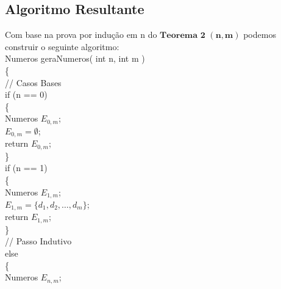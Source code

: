 \documentclass[twoside]{article}
\begin{document}
\begin{multicols}{2}
\subsection{ Algoritmo Resultante }
\indent 
Com base na prova por indução em n do $\mathbf{Teorema}$ $\mathbf{2}$ $\mathbf{(n,m)}$ podemos construir o seguinte algoritmo:\\
{\color[rgb]{0,0,1} Numeros} {\color[rgb]{0,0.5,0.5} geraNumeros}( {\color[rgb]{0,0,1} int} n, {\color[rgb]{0,0,1} int} m )\\
\{\\
\hspace*{5mm} {\color[rgb]{0,0.5,0}// Casos Bases}\\
\hspace*{5mm} {\color[rgb]{0.7,0.3,0} if} (n == 0)\\
\hspace*{5mm} \{\\
\hspace*{10mm} {\color[rgb]{0,0,1} Numeros} $E_{0,m}$;\\
\hspace*{10mm} $E_{0,m} = \emptyset$;\\
\hspace*{10mm} {\color[rgb]{0.5,0,1} return}  $E_{0,m}$;\\
\hspace*{5mm} \}\\
\hspace*{5mm} {\color[rgb]{0.7,0.3,0} if} (n == 1)\\
\hspace*{5mm} \{\\
\hspace*{10mm} {\color[rgb]{0,0,1} Numeros} $E_{1,m}$;\\
\hspace*{10mm} $E_{1,m} = \{d_1,d_2,\dots,d_m\}$;\\
\hspace*{10mm} {\color[rgb]{0.5,0,1} return} $E_{1,m}$;\\
\hspace*{5mm} \}\\
\hspace*{5mm} {\color[rgb]{0,0.5,0}// Passo Indutivo}\\
\hspace*{5mm} {\color[rgb]{0.7,0.3,0} else}\\
\hspace*{5mm} \{\\
\hspace*{10mm} {\color[rgb]{0,0,1} Numeros} $E_{n,m}$;\\

\end{multicols}
\end{document}

